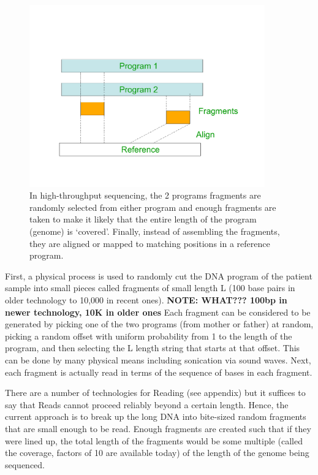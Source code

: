 \documentclass[10pt,fullpage]{article}
\begin{document}
\begin{figure}[h!]
  \centering
\includegraphics[trim = 10mm 10mm 10mm 30mm, clip, width=4in]{fig/ngs.pdf}  
  \caption{In high-throughput sequencing, the 2 programs fragments are
    randomly selected from either program and enough fragments are
    taken to make it likely that the entire length of the program
    (genome) is `covered'.  Finally, instead of assembling the
    fragments, they are aligned or mapped to matching positions in a
    reference program.}
  \label{fig:NGS}
\end{figure}

First, a physical process is used to randomly cut the DNA program of
the patient sample into small pieces called fragments of small length
L (100 base pairs in older technology to 10,000 in recent ones).{\bf
NOTE: WHAT??? 100bp in newer technology, 10K in older ones}  Each
fragment can be considered to be generated by picking one of the two
programs (from mother or father) at random, picking a random offset
with uniform probability from 1 to the length of the program, and then
selecting the L length string that starts at that offset.  This can be
done by many physical means including sonication via sound waves.
Next, each fragment is actually read in terms of the sequence of bases
in each fragment.

There are a number of technologies for Reading (see appendix) but it
suffices to say that Reads cannot proceed reliably beyond a certain
length.  Hence, the current approach is to break up the long DNA into
bite-sized random fragments that are small enough to be read.
Enough fragments are created such that if they were lined up, the
total length of the fragments would be some multiple (called the
coverage, factors of 10 are available today) of the length of the
genome being sequenced.
\end{document}
